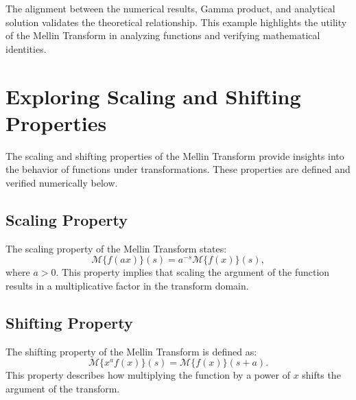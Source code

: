\documentclass[a4paper, 12pt]{article}
\begin{document}
The alignment between the numerical results, Gamma product, and analytical solution validates the theoretical relationship. This example highlights the utility of the Mellin Transform in analyzing functions and verifying mathematical identities.


\section{Exploring Scaling and Shifting Properties}

The scaling and shifting properties of the Mellin Transform provide insights into the behavior of functions under transformations. These properties are defined and verified numerically below.

\subsection{Scaling Property}
The scaling property of the Mellin Transform states:
\begin{equation}
\mathcal{M}\{f(ax)\}(s) = a^{-s} \mathcal{M}\{f(x)\}(s),
\end{equation}
where $a > 0$. This property implies that scaling the argument of the function results in a multiplicative factor in the transform domain.

\subsection{Shifting Property}
The shifting property of the Mellin Transform is defined as:
\begin{equation}
\mathcal{M}\{x^a f(x)\}(s) = \mathcal{M}\{f(x)\}(s + a).
\end{equation}
This property describes how multiplying the function by a power of $x$ shifts the argument of the transform.
\end{document}
